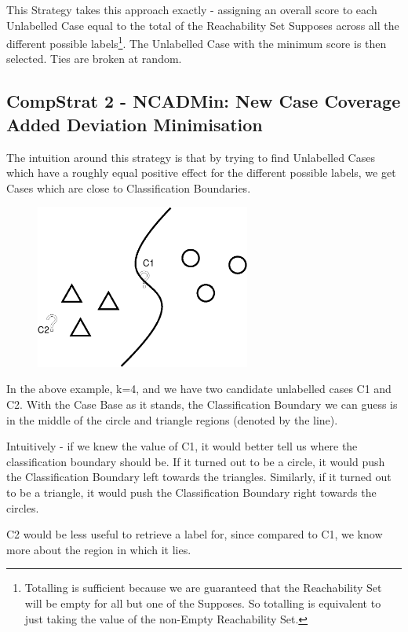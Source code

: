 \documentclass[a4paper,11pt]{report}
\begin{document}
This Strategy takes this approach exactly - assigning an overall score to each Unlabelled Case equal to the total of the Reachability Set Supposes across all the different possible labels\footnote{Totalling is sufficient because we are guaranteed that the Reachability Set will be empty for all but one of the Supposes. So totalling is equivalent to just taking the value of the non-Empty Reachability Set.}. The Unlabelled Case with the minimum score is then selected. Ties are broken at random.

\subsection{CompStrat 2 - NCADMin: New Case Coverage Added Deviation Minimisation}

The intuition around this strategy is that by trying to find Unlabelled Cases which have a roughly equal positive effect for the different possible labels, we get Cases which are close to Classification Boundaries.

\begin{figure}[h!] \centering
\includegraphics[width=200pt]{./Drawn/NCADMin}
\end{figure}

In the above example, k=4, and we have two candidate unlabelled cases C1 and C2. With the Case Base as it stands, the Classification Boundary we can guess is in the middle of the circle and triangle regions (denoted by the line).
 
Intuitively - if we knew the value of C1, it would better tell us where the classification boundary should be. If it turned out to be a circle, it would push the Classification Boundary left towards the triangles. Similarly, if it turned out to be a triangle, it would push the Classification Boundary right towards the circles. 

C2 would be less useful to retrieve a label for, since compared to C1, we know more about the region in which it lies.
\end{document}
